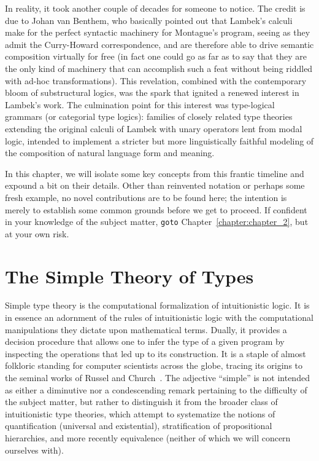 In reality, it took another couple of decades for someone to notice.
The credit is due to Johan van Benthem, who basically pointed out that Lambek's calculi make for the perfect syntactic machinery for Montague's program, seeing as they admit the Curry-Howard correspondence, and are therefore able to drive semantic composition virtually for free (in fact one could go as far as to say that they are the only kind of machinery that can accomplish such a feat without being riddled with ad-hoc transformations).
This revelation, combined with the contemporary bloom of substructural logics, was the spark that ignited a renewed interest in Lambek's work.
The culmination point for this interest was type-logical grammars (or categorial type logics): families of closely related type theories extending the original calculi of Lambek with unary operators lent from modal logic, intended to implement a stricter but more linguistically faithful modeling of the composition of natural language form and meaning.

In this chapter, we will isolate some key concepts from this frantic timeline and expound a bit on their details.
Other than reinvented notation or perhaps some fresh example, no novel contributions are to be found here; the intention is merely to establish some common grounds before we get to proceed. 
If confident in your knowledge of the subject matter, \texttt{goto} Chapter~\ref{chapter:chapter_2}, but at your own risk.


\newpage

\section{The Simple Theory of Types}\label{section:simple_type_theory}

Simple type theory is the computational formalization of intuitionistic logic. 
It is in essence an adornment of the rules of intuitionistic logic with the computational manipulations they dictate upon mathematical terms.
Dually, it provides a decision procedure that allows one to infer the type of a given program by inspecting the operations that led up to its construction.
It is a staple of almost folkloric standing for computer scientists across the globe, tracing its origins to the seminal works of Russel and Church~\cite{russel1908,church1940}.
The adjective ``simple'' is not intended as either a diminutive nor a condescending remark pertaining to the difficulty of the subject matter, but rather to distinguish it from the broader class of intuitionistic type theories, which attempt to systematize the notions of quantification (universal and existential), stratification of propositional hierarchies, and more recently equivalence (neither of which we will concern ourselves with).

